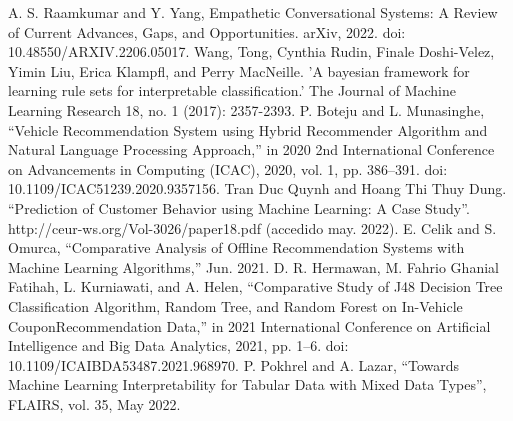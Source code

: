 \documentclass[conference]{IEEEtran}
\begin{document}
\begin{thebibliography}{00}
 A. S. Raamkumar and Y. Yang, Empathetic Conversational Systems: A Review of Current Advances, Gaps, and Opportunities. arXiv, 2022. doi: 10.48550/ARXIV.2206.05017.
 Wang, Tong, Cynthia Rudin, Finale Doshi-Velez, Yimin Liu, Erica Klampfl, and Perry MacNeille. 'A bayesian framework for learning rule sets for interpretable classification.' The Journal of Machine Learning Research 18, no. 1 (2017): 2357-2393.
 P. Boteju and L. Munasinghe, “Vehicle Recommendation System using Hybrid Recommender Algorithm and Natural Language Processing Approach,” in 2020 2nd International Conference on Advancements in Computing (ICAC), 2020, vol. 1, pp. 386–391. doi: 10.1109/ICAC51239.2020.9357156.
 Tran Duc Quynh and Hoang Thi Thuy Dung. “Prediction of Customer Behavior using Machine Learning: A Case Study”. http://ceur-ws.org/Vol-3026/paper18.pdf (accedido may. 2022).
 E. Celik and S. Omurca, “Comparative Analysis of Offline Recommendation Systems with Machine Learning Algorithms,” Jun. 2021.
 D. R. Hermawan, M. Fahrio Ghanial Fatihah, L. Kurniawati, and A. Helen, “Comparative Study of J48 Decision Tree Classification Algorithm, Random Tree, and Random Forest on In-Vehicle CouponRecommendation Data,” in 2021 International Conference on Artificial Intelligence and Big Data Analytics, 2021, pp. 1–6. doi: 10.1109/ICAIBDA53487.2021.968970.
 P. Pokhrel and A. Lazar, “Towards Machine Learning Interpretability for Tabular Data with Mixed Data Types”, FLAIRS, vol. 35, May 2022.
\end{thebibliography}
\end{document}
